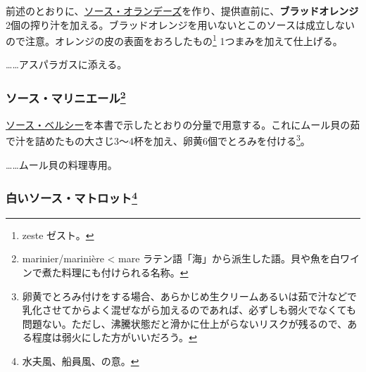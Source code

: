 \begin{recette}

前述のとおりに、\protect\hyperlink{sauce-hollandaise}{ソース・オランデーズ}を作り、提供直前に、\textbf{ブラッドオレンジ}2個の搾り汁を加える。ブラッドオレンジを用いないとこのソースは成立しないので注意。オレンジの皮の表面をおろしたもの\footnote{zeste
  ゼスト。} 1つまみを加えて仕上げる。

\ldots{}\ldots{}アスパラガスに添える。

\hypertarget{sauce-mariniere}{%
\subsubsection[ソース・マリニエール]{\texorpdfstring{ソース・マリニエール\footnote{marinier/marinière
  \textless{} mare
  ラテン語「海」から派生した語。貝や魚を白ワインで煮た料理にも付けられる名称。}}{ソース・マリニエール}}\label{sauce-mariniere}}



\protect\hyperlink{sauce-bercy}{ソース・ベルシー}を本書で示したとおりの分量で用意する。これにムール貝の茹で汁を詰めたもの大さじ3〜4杯を加え、卵黄6個でとろみを付ける\footnote{卵黄でとろみ付けをする場合、あらかじめ生クリームあるいは茹で汁などで乳化させてからよく混ぜながら加えるのであれば、必ずしも弱火でなくても問題ない。ただし、沸騰状態だと滑かに仕上がらないリスクが残るので、ある程度は弱火にした方がいいだろう。}。

\ldots{}\ldots{}ムール貝の料理専用。

\hypertarget{sauce-matelote-blanche}{%
\subsubsection[白いソース・マトロット]{\texorpdfstring{白いソース・マトロット\footnote{水夫風、船員風、の意。}}{白いソース・マトロット}}\label{sauce-matelote-blanche}}


\end{recette}
